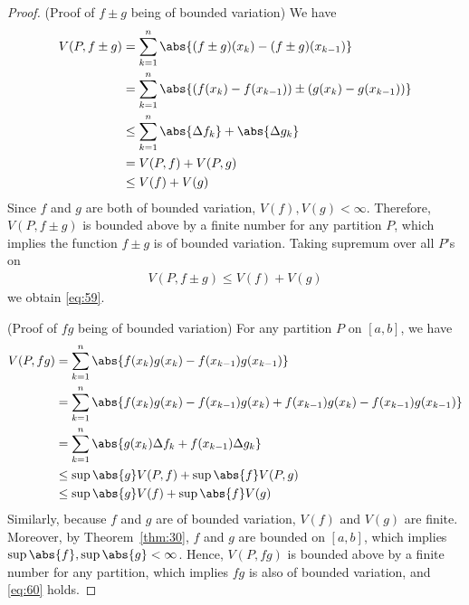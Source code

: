 \documentclass[thmcnt=section, 12pt]{elegantbook}
\begin{document}
\begin{proof}
    (Proof of $f \pm g$ being of bounded variation) We have 
    \begin{align*}
        V(P, f \pm g)
        &= \sum_{k=1}^n \abs{(f \pm g)(x_k) - (f \pm g)(x_{k-1})} \\ 
        &= \sum_{k=1}^n \abs{\left(f(x_k) - f(x_{k-1})\right) \pm \left(g(x_k) - g(x_{k-1})\right)} \\ 
        &\leq \sum_{k=1}^n \abs{\Delta f_k} + \abs{\Delta g_k} \\ 
        &= V(P, f) + V(P, g) \\ 
        &\leq V(f) + V(g)
    \end{align*}
    Since $f$ and $g$ are both of bounded variation, $V(f), V(g) < \infty$. Therefore, $V(P, f \pm g)$ is bounded above by a finite number for any partition $P$, which implies the function $f \pm g$ is of bounded variation. Taking supremum over all $P$'s on 
    \begin{align*}
        V(P, f \pm g) \leq V(f) + V(g)
    \end{align*}
    we obtain \eqref{eq:59}.
    
    \par (Proof of $f g$ being of bounded variation) For any partition $P$ on $[a, b]$, we have 
    \begin{align*}
        V(P, f g)
        &= \sum_{k=1}^n \abs{f(x_k) g(x_k) - f(x_{k-1}) g(x_{k-1})} \\ 
        &= \sum_{k=1}^n \abs{
            f(x_k) g(x_k) 
            - f(x_{k-1}) g(x_k) 
            + f(x_{k-1}) g(x_k) 
            - f(x_{k-1}) g(x_{k-1})
        } \\  
        &= \sum_{k=1}^n \abs{
            g(x_k) \Delta f_k
            + f(x_{k-1}) \Delta g_k
        } \\ 
        &\leq \sup\abs{g} V(P, f) + \sup\abs{f} V(P, g) \\ 
        &\leq \sup\abs{g} V(f) + \sup\abs{f} V(g)
    \end{align*}
    Similarly, because $f$ and $g$ are of bounded variation, $V(f)$ and $V(g)$ are finite. Moreover, by Theorem~\ref{thm:30}, $f$ and $g$ are bounded on $[a, b]$, which implies $\sup\abs{f}, \sup\abs{g} < \infty$. Hence, $V(P, f g)$ is bounded above by a finite number for any partition, which implies $fg$ is also of bounded variation, and \eqref{eq:60} holds.
\end{proof}

\end{document}

